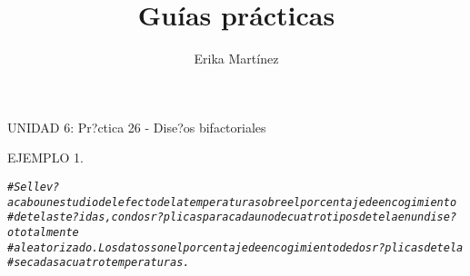 \documentclass[10pt,a4paper]{article}\usepackage[]{graphicx}\usepackage[]{color}
\author{Erika Martínez}
\title{Guías prácticas}
\makeatletter
\newcommand{\hlcom}[1]{\textcolor[rgb]{0.678,0.584,0.686}{\textit{#1}}}%
\newenvironment{kframe}{%
 \def\at@end@of@kframe{}%
 \ifinner\ifhmode%
  \def\at@end@of@kframe{\end{minipage}}%
  \begin{minipage}{\columnwidth}%
 \fi\fi%
 \def\FrameCommand##1{\hskip\@totalleftmargin \hskip-\fboxsep
 \colorbox{shadecolor}{##1}\hskip-\fboxsep
     \hskip-\linewidth \hskip-\@totalleftmargin \hskip\columnwidth}%
 \MakeFramed {\advance\hsize-\width
   \@totalleftmargin\z@ \linewidth\hsize
   \@setminipage}}%
 {\par\unskip\endMakeFramed%
 \at@end@of@kframe}
\newenvironment{knitrout}{}{} %
\makeatother
\begin{document}
\maketitle
\newpage

UNIDAD 6: Pr?ctica 26 - Dise?os bifactoriales

EJEMPLO 1. 
\begin{knitrout}
\color{fgcolor}\begin{kframe}
\begin{alltt}
\hlcom{#Se llev? a cabo un estudio del efecto de la temperatura sobre el porcentaje de encogimiento}
\hlcom{#de telas te?idas, con dos r?plicas para cada uno de cuatro tipos de tela en un dise?o totalmente }
\hlcom{#aleatorizado. Los datos son el porcentaje de encogimiento de dos r?plicas de tela }
\hlcom{#secadas a cuatro temperaturas.}


\end{alltt}
\end{kframe}
\end{knitrout}
\end{document}
